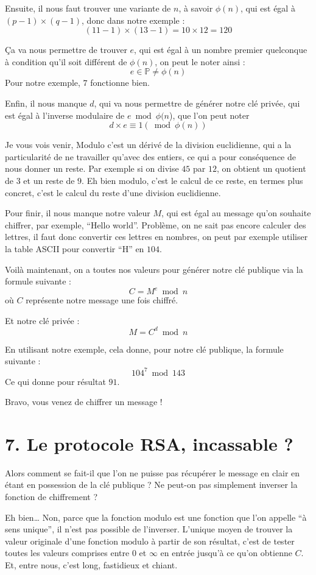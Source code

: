 \documentclass[
  paper=a4,
  ,captions=tableheading
]{scrartcl}
\begin{document}
Ensuite, il nous faut trouver une variante de \(n\), à savoir
\(\phi(n)\), qui est égal à \((p-1)\times(q-1)\), donc dans notre
exemple : \[(11-1)\times(13-1)=10\times12=120\]

Ça va nous permettre de trouver \(e\), qui est égal à un nombre premier
quelconque à condition qu'il soit différent de \(\phi(n)\), on peut le
noter ainsi : \[
e \in \mathbb{P}\ne \phi(n)
\] Pour notre exemple, \(7\) fonctionne bien.

Enfin, il nous manque \(d\), qui va nous permettre de générer notre clé
privée, qui est égal à l'inverse modulaire de \(e \bmod \phi(n\)), que
l'on peut noter \[d \times e \equiv 1 (\bmod \phi(n))\]

Je vous vois venir, Modulo c'est un dérivé de la division euclidienne,
qui a la particularité de ne travailler qu'avec des entiers, ce qui a
pour conséquence de nous donner un reste. Par exemple si on divise
\(45\) par \(12\), on obtient un quotient de \(3\) et un reste de \(9\).
Eh bien modulo, c'est le calcul de ce reste, en termes plus concret,
c'est le calcul du reste d'une division euclidienne.

Pour finir, il nous manque notre valeur \(M\), qui est égal au message
qu'on souhaite chiffrer, par exemple, ``Hello world''. Problème, on ne
sait pas encore calculer des lettres, il faut donc convertir ces lettres
en nombres, on peut par exemple utiliser la table ASCII pour convertir
``H'' en \(104\).

Voilà maintenant, on a toutes nos valeurs pour générer notre clé
publique via la formule suivante : \[
C = M^e \bmod n
\] où \(C\) représente notre message une fois chiffré.

Et notre clé privée : \[
M = C^d \bmod n
\]

En utilisant notre exemple, cela donne, pour notre clé publique, la
formule suivante : \[
104^{7} \bmod 143
\] Ce qui donne pour résultat \(91\).

Bravo, vous venez de chiffrer un message !

\section{7. Le protocole RSA, incassable
?}\label{le-protocole-rsa-incassable}

Alors comment se fait-il que l'on ne puisse pas récupérer le message en
clair en étant en possession de la clé publique ? Ne peut-on pas
simplement inverser la fonction de chiffrement ?

Eh bien\ldots{} Non, parce que la fonction \(\text{modulo}\) est une
fonction que l'on appelle ``à sens unique'', il n'est pas possible de
l'inverser. L'unique moyen de trouver la valeur originale d'une fonction
\(\text{modulo}\) à partir de son résultat, c'est de tester toutes les
valeurs comprises entre \(0\) et \(\infty\) en entrée jusqu'à ce qu'on
obtienne \(C\). Et, entre nous, c'est long, fastidieux et chiant.
\end{document}
